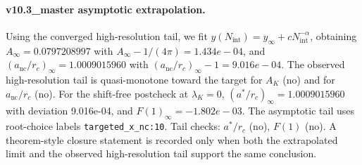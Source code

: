 \paragraph{v10.3_master asymptotic extrapolation.}
Using the converged high-resolution tail, we fit $y(N_{\mathrm{int}})=y_{\infty}+cN_{\mathrm{int}}^{-\alpha}$, obtaining $A_\infty=0.0797208997$ with $A_\infty-1/(4\pi)=1.434e-04$, and $(a_{\mathrm{nc}}/r_c)_\infty=1.0009015960$ with $(a_{\mathrm{nc}}/r_c)_\infty-1=9.016e-04$. The observed high-resolution tail is quasi-monotone toward the target for $A_K$ (no) and for $a_{\mathrm{nc}}/r_c$ (no). For the shift-free postcheck at $\lambda_K=0$, $(a^*/r_c)_\infty=1.0009015960$ with deviation 9.016e-04, and $F(1)_\infty=-1.802e-03$. The asymptotic tail uses root-choice labels \texttt{targeted_x_nc:10}. Tail checks: $a^*/r_c$ (no), $F(1)$ (no). A theorem-style closure statement is recorded only when both the extrapolated limit and the
observed high-resolution tail support the same conclusion.
